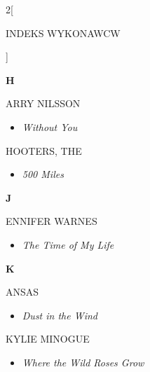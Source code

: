 \documentclass[a4paper]{report}
\begin{document}
\begin{multicols*}{2}[\begin{Huge}INDEKS WYKONAWCW\end{Huge}\vspace{1cm}]
\begin{minipage}{\columnwidth}
\begin{itemize}[topsep=3pt, after=\vspace{3mm}]
	\end{itemize}
\end{minipage}
\begin{minipage}{\columnwidth}
	\begin{Large}\textbf{H}\end{Large}ARRY NILSSON 
	\begin{itemize}[topsep=3pt, after=\vspace{3mm}]
		\itemsep0em
		\item[]\textit{Without You}  \\
	\end{itemize}
\end{minipage}
\begin{minipage}{\columnwidth}
	HOOTERS, THE 
	\begin{itemize}[topsep=3pt, after=\vspace{3mm}]
		\itemsep0em
		\item[]\textit{500 Miles}  \\
	\end{itemize}
\end{minipage}
\begin{minipage}{\columnwidth}
	\begin{Large}\textbf{J}\end{Large}ENNIFER WARNES 
	\begin{itemize}[topsep=3pt, after=\vspace{3mm}]
		\itemsep0em
		\item[]\textit{The Time of My Life}  \\
	\end{itemize}
\end{minipage}
\begin{minipage}{\columnwidth}
	\begin{Large}\textbf{K}\end{Large}ANSAS 
	\begin{itemize}[topsep=3pt, after=\vspace{3mm}]
		\itemsep0em
		\item[]\textit{Dust in the Wind}  \\
	\end{itemize}
\end{minipage}
\begin{minipage}{\columnwidth}
	KYLIE MINOGUE 
	\begin{itemize}[topsep=3pt, after=\vspace{3mm}]
		\itemsep0em
		\item[]\textit{Where the Wild Roses Grow}  \\

\end{itemize}
\end{minipage}
\end{multicols*}
\end{document}
